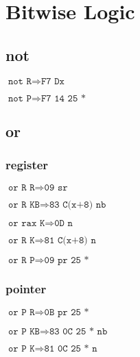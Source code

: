 \documentclass{article}
\begin{document}
\section{Bitwise Logic}

\subsection{not}
\begin{minipage}{\textwidth}

$\texttt{not R} \Rightarrow \texttt{F7 Dx}$

$\texttt{not P} \Rightarrow \texttt{F7 14 25 *}$

\end{minipage}


\subsection{or}
\begin{minipage}{\textwidth}

\subsubsection{register}

$\texttt{or R R} \Rightarrow \texttt{09 sr}$

$\texttt{or R KB} \Rightarrow \texttt{83 C(x+8) nb}$

$\texttt{or rax K} \Rightarrow \texttt{0D n}$

$\texttt{or R K} \Rightarrow \texttt{81 C(x+8) n}$

$\texttt{or R P} \Rightarrow \texttt{09 pr 25 *}$


\subsubsection{pointer}

$\texttt{or P R} \Rightarrow \texttt{0B pr 25 *}$

$\texttt{or P KB} \Rightarrow \texttt{83 0C 25 * nb}$

$\texttt{or P K} \Rightarrow \texttt{81 0C 25 * n}$

\end{minipage}
\end{document}
